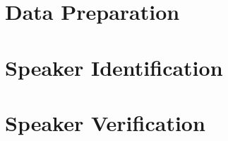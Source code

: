 \section{Data Preparation}
\label{sec:data-preparation}

\section{Speaker Identification}
\label{sec:identification-exp}

\section{Speaker Verification}
\label{sec:verification-exp}